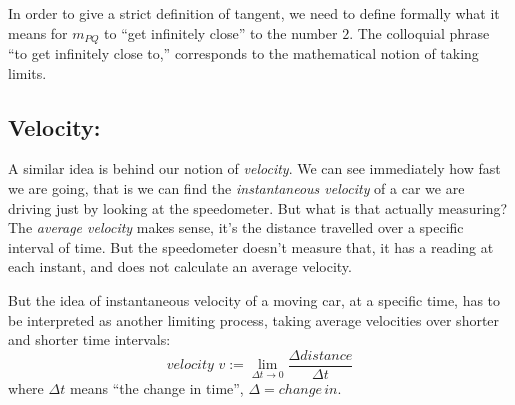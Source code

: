 

In order to give a strict definition of tangent, we need to define formally what it means for $m_{PQ}$ to ``get infinitely close'' to the number $2$. The colloquial phrase ``to get infinitely close to,'' corresponds to the mathematical notion of taking limits.

\subsection*{Velocity:}

A similar idea is behind our notion of \textit{velocity}. We can see immediately
how fast we are going, that is we can find the \textit{instantaneous velocity} of a
car we are driving just by looking at the speedometer. But what is that actually
measuring? The \textit{average velocity} makes sense, it's the distance travelled
over a specific interval of time. But the speedometer doesn't measure that, it
has a reading at each instant, and does not calculate an average velocity.

But the idea of instantaneous velocity of a moving car, at a specific time,
has to be interpreted as another limiting process, taking average velocities
over shorter and shorter time intervals:\[
velocity\, \, v:=\lim _{\Delta t\rightarrow 0}\frac{\Delta distance}{\Delta t}\]
where \( \Delta t \) means {}``the change in time{}'', \( \Delta =change\, in \).


